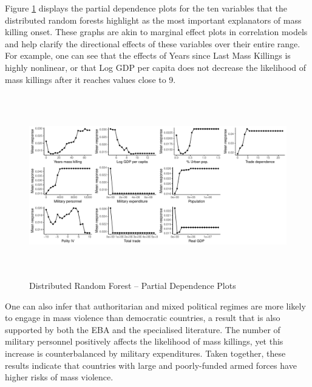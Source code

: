 \documentclass[a4paper,12pt]{article}
\begin{document}
Figure \ref{fig:drfdpp} displays the partial dependence plots for the ten variables that the distributed random forests highlight as the most important explanators of mass killing onset. These graphs are akin to marginal effect plots in correlation models and help clarify the directional effects of these variables over their entire range. For example, one can see that the effects of Years since Last Mass Killings is highly nonlinear, or that Log GDP per capita does not decrease the likelihood of mass killings after it reaches values close to 9.

\begin{figure}[H]
    \centering
    \includegraphics[width=\textwidth, height=8cm]{images/rf-mk-pd.pdf}
    \caption{Distributed Random Forest -- Partial Dependence Plots}
    \label{fig:drfdpp}
\end{figure}

One can also infer that authoritarian and mixed political regimes are more likely to engage in mass violence than democratic countries, a result that is also supported by both the EBA and the specialised literature. The number of military personnel positively affects the likelihood of mass killings, yet this increase is counterbalanced by military expenditures. Taken together, these results indicate that countries with large and poorly-funded armed forces have higher risks of mass violence. 
\end{document}
